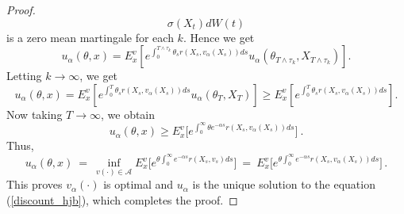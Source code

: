\documentclass[11pt]{amsart}
\numberwithin{equation}{section}
\begin{document}
\begin{proof}
$${\sigma(X_t) dW(t) } $$ is a zero mean martingale for each $k$.
Hence we get
\begin{equation*}
 u_{\alpha}(\theta, x) = E^v_x\left[ e^{\int_{0}^{T\wedge \tau_k}
 \theta_s r(X_s,v_{\alpha}(X_s)) ds} u_{\alpha}(\theta_{T\wedge \tau_k} , X_{T\wedge \tau_k})\right].
\end{equation*}
Letting $k\rightarrow \infty$, we get 
\begin{equation*}
 u_{\alpha}(\theta, x) = E^v_x\left[ e^{\int_{0}^{T} \theta_s r(X_s,v_{\alpha}(X_s)) ds} 
 u_{\alpha}(\theta_{T} , X_T)\right]\geq E^v_x\left[ e^{\int_{0}^{T} \theta_s r(X_s,v_{\alpha}(X_s)) ds} \right].
\end{equation*}
Now  taking $T\rightarrow \infty$, we obtain 
\begin{equation*}
 u_{\alpha}(\theta, x) \geq E^v_x\Big[ e^{ \int_{0}^{\infty} \theta e^{-\alpha s} r(X_s,v_{\alpha}(X_s)) ds } \Big] \ .
\end{equation*}
Thus,
\[
u_{\alpha}(\theta, x) \ = \ \inf_{v(\cdot) \in {\mathcal A}} E^v_x \Big[ 
e^{\theta \int^{\infty}_0 e^{- \alpha s}r(X_s, v_s) ds } \Big]
\ = \  E^v_x \Big[ e^{\theta \int^{\infty}_0 e^{- \alpha s}r(X_s, v_{\alpha}(X_s)) ds} 
 \Big] \, .
\]
This proves $v_{\alpha}(\cdot)$ is
optimal and $u_{\alpha}$ is the unique solution to the equation (\ref{discount_hjb}), which completes the proof. 
\end{proof}
\end{document}
